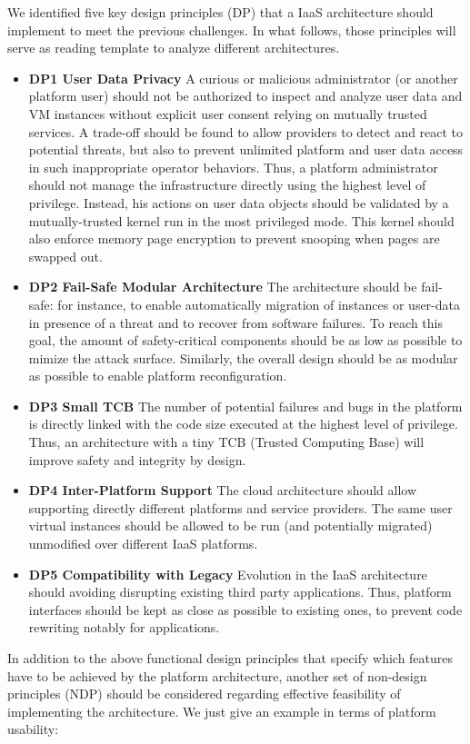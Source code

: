 \documentclass{sig-alternate}
\begin{document}
We identified five key design principles (DP) that a IaaS architecture should implement to meet the previous challenges. In what follows, those principles will serve as reading template to analyze different architectures.
\begin{itemize}[]
\item \textbf{DP1 User Data Privacy} A curious or malicious administrator (or another platform user) should not be authorized to inspect and analyze user data and VM instances without explicit user consent relying on mutually trusted services. A trade-off should be found to allow providers to detect and react to potential threats, but also to prevent unlimited platform and user data access in such inappropriate operator behaviors. Thus, a platform administrator should not manage the infrastructure directly using the highest level of privilege. Instead, his actions on user data objects should be validated by a mutually-trusted kernel run in the most privileged mode. This kernel should also enforce memory page encryption to prevent snooping when pages are swapped out.
\item \textbf{DP2 Fail-Safe Modular Architecture} The architecture should be fail-safe: for instance, to enable automatically migration of instances or user-data in presence of a threat and to recover from software failures. To reach this goal, the amount of safety-critical components should be as low as possible to mimize the attack surface. Similarly, the overall design should be as modular as possible to enable platform reconfiguration.
\item \textbf{DP3 Small TCB} The number of potential failures and bugs in the platform is directly linked with the code size executed at the highest level of privilege. Thus, an architecture with a tiny TCB (Trusted Computing Base) will improve safety and integrity by design.
\item \textbf{DP4 Inter-Platform Support} The cloud architecture should allow supporting directly different platforms and service providers. The same user virtual instances should be allowed to be run (and potentially migrated) unmodified over different IaaS platforms.
\item \textbf{DP5 Compatibility with Legacy} Evolution in the IaaS architecture should avoiding disrupting existing third party applications. Thus, platform interfaces should be kept as close as possible to existing ones, to prevent code rewriting notably for applications.
\end{itemize}
In addition to the above functional design principles that specify which features have to be achieved by the platform architecture, another set of non-design principles (NDP) should be considered regarding effective feasibility of implementing the architecture. We just give an example in terms of platform usability:
\end{document}
